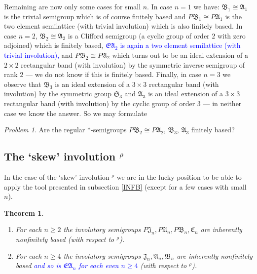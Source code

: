 \documentclass[preprint,1p,times]{elsarticle}
\numberwithin{equation}{section}
\newtheorem{Thm}{Theorem}[section]
\theoremstyle{remark}
\newtheorem{Problem}{Problem}[section]
\def\blue#1{\textcolor{blue}{#1}}
\def\A{\mathfrak{A}}
\def\C{\mathfrak{C}}
\def\B{\mathfrak{B}}
\def\J{\mathfrak{J}}
\def\Sim{\mathfrak{S}}
\begin{document}
Remaining are now only some cases for small $n$. In case $n=1$ we have: $\B_1\cong \A_1$ is the trivial semigroup which is
of course finitely based and $P\B_1\cong P\A_1$ is the two element semilattice (with trivial involution) which is also
finitely based. In case $n=2$, $\B_2\cong \A_2$ is a Clifford semigroup (a cyclic group of order $2$ with zero
adjoined) which is finitely based, \blue{$\mathfrak{EA}_2$ is again a two element semilattice (with trivial involution),} and $P\B_2\cong P\A_2$ which turns out to be an ideal extension of a $2\times 2$
rectangular band (with involution) by the symmetric inverse semigroup of rank 2 --- we do not know if this is finitely
based. Finally, in case $n=3$ we observe that $\B_3$ is an ideal extension of a $3\times 3$ rectangular band (with
involution) by the symmetric group $\Sim_3$ and $\A_3$ is an ideal extension of a $3\times 3$ rectangular band (with
involution) by the cyclic group of order $3$ --- in neither case we know the answer.  So we may formulate
\begin{Problem}
Are the regular $*$-semigroups $P\B_2\cong P\A_2$, $\B_3$, $\A_3$ finitely based?
\end{Problem}

\subsection{The `skew' involution $^\rho$}

In the case of the `skew' involution $^\rho$ we are in the lucky position to be able to apply  the tool presented in
subsection \ref{INFB} (except for a few cases with small $n$).

\begin{Thm}
\begin{enumerate}
\item For each $n\ge 2$ the involutory semigroups $P\J_n,P\A_n,P\B_n,\C_n$ are inherently nonfinitely based (with respect to $^\rho$).
\item For each $n\ge 4$ the involutory semigroups $\J_n,\A_n,\B_n$  are inherently nonfinitely based \blue{and so is $\mathfrak{EA}_{n}$ for each even $n\ge 4$} (with respect to $^\rho$).
\end{enumerate}
\end{Thm}
\end{document}

